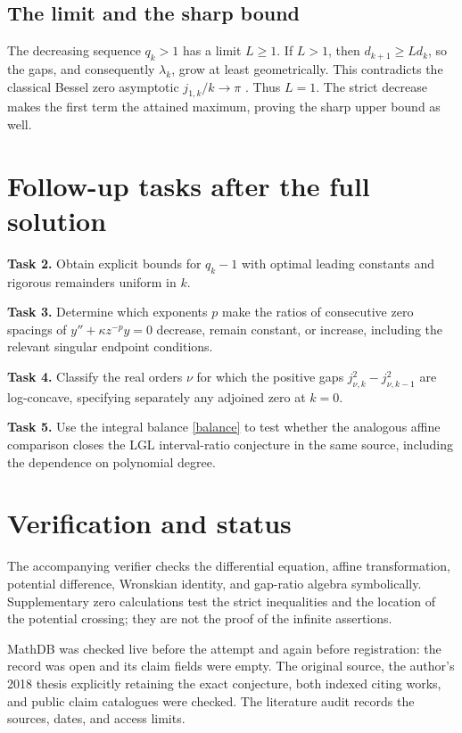 \documentclass[11pt]{article}
\begin{document}
\subsection*{The limit and the sharp bound}
The decreasing sequence $q_k>1$ has a limit $L\geq1$.
If $L>1$, then $d_{k+1}\geq Ld_k$, so the gaps, and consequently
$\lambda_k$, grow at least geometrically.
This contradicts the classical Bessel zero asymptotic
$j_{1,k}/k\to\pi$ \cite{DLMF}. Thus $L=1$.
The strict decrease makes the first term the attained maximum,
proving the sharp upper bound as well.

\section*{Follow-up tasks after the full solution}
\noindent\textbf{Task 2.}
Obtain explicit bounds for $q_k-1$ with optimal leading constants and
rigorous remainders uniform in $k$.

\medskip
\noindent\textbf{Task 3.}
Determine which exponents $p$ make the ratios of consecutive zero
spacings of $y''+\kappa z^{-p}y=0$ decrease, remain constant, or increase,
including the relevant singular endpoint conditions.

\medskip
\noindent\textbf{Task 4.}
Classify the real orders $\nu$ for which the positive gaps
$j_{\nu,k}^2-j_{\nu,k-1}^2$ are log-concave, specifying separately any
adjoined zero at $k=0$.

\medskip
\noindent\textbf{Task 5.}
Use the integral balance \eqref{balance} to test whether the analogous
affine comparison closes the LGL interval-ratio conjecture in the same
source, including the dependence on polynomial degree.

\section*{Verification and status}
The accompanying verifier checks the differential equation, affine
transformation, potential difference, Wronskian identity, and gap-ratio
algebra symbolically. Supplementary zero calculations test the strict
inequalities and the location of the potential crossing; they are not
the proof of the infinite assertions.

MathDB was checked live before the attempt and again before registration:
the record was open and its claim fields were empty. The original source,
the author's 2018 thesis explicitly retaining the exact conjecture, both
indexed citing works, and public claim catalogues were checked.
The literature audit records the sources, dates, and access limits.
\end{document}
